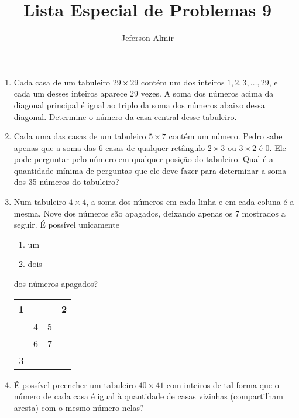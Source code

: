 \documentclass{article}
\title{Lista Especial de Problemas 9}
\author{Jeferson Almir}
\date{}
\begin{document}
\maketitle

\begin{enumerate}
    \item Cada casa de um tabuleiro $29\times 29$ contém um dos inteiros $1,2,3,\dots,29$,
    e cada um desses inteiros aparece 29 vezes.
    A soma dos números acima da diagonal principal é igual
    ao triplo da soma dos números abaixo dessa diagonal.
    Determine o número da casa central desse tabuleiro.
    
    \item Cada uma das casas de um tabuleiro $5\times 7$ contém um número.
    Pedro sabe apenas que a soma das 6 casas de qualquer retângulo $2\times 3$ ou $3\times 2$ é 0.
    Ele pode perguntar pelo número em qualquer posição do tabuleiro.
    Qual é a quantidade mínima de perguntas que ele deve fazer
    para determinar a soma dos 35 números do tabuleiro?
    
    \item Num tabuleiro $4\times 4$,
    a soma dos números em cada linha e em cada coluna é a mesma.
    Nove dos números são apagados,
    deixando apenas os 7 mostrados a seguir.
    É possível unicamente
    
    \begin{enumerate}
    \item um
    
    \item dois
    \end{enumerate}
    
    dos números apagados?
    
    \begin{center}
    \begin{tabular}{|c|c|c|c|}
    \hline
    1 &   &   & 2\\
    \hline
      & 4 & 5 &  \\
    \hline
      & 6 & 7 &  \\
    \hline
    3 &   &   &  \\
    \hline
    \end{tabular}
    \end{center}
    
    \item É possível preencher um tabuleiro $40\times 41$ com inteiros
    de tal forma que o número de cada casa
    é igual à quantidade de casas vizinhas (compartilham aresta)
    com o mesmo número nelas?
    

\end{enumerate}
\end{document}

